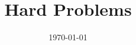 \documentclass{beamer}
\title[]{Hard Problems} %
\institute[BYU] %
{
Brigham Young University \\ %
\medskip
}
\date{\today} %
\begin{document}
\begin{frame}
\titlepage %
\end{frame}





\end{document}

